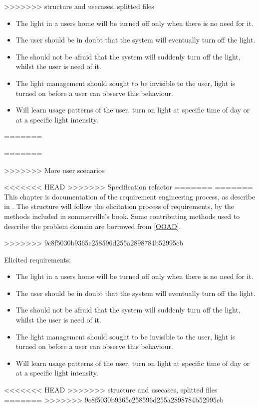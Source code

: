 
>>>>>>> structure and usecases, splitted files

\begin{itemize}
\item The light in a users home will be turned off only when there is no need for it.
\item The user should be in doubt that the system will eventually turn off the light.
\item The should not be afraid that the system will suddenly turn off the light, whilst the user is need of it.
\item The light management should sought to be invisible to the user, light is turned on before a user can observe this behaviour.
\item Will learn usage patterns of the user, turn on light at specific time of day or at a specific light intensity.
\end{itemize}
=======

=======

>>>>>>> More user scenarios



<<<<<<< HEAD
>>>>>>> Specification refactor
=======
=======
This chapter is documentation of the requirement engineering process, as describe in \cite{sommerville}. The structure will follow the elicitation process of requirements, by the methods included in sommerville's book. Some contributing methods used to describe the problem domain are borrowed from \cref{OOAD}. 









>>>>>>> 9c8f5030b9365c258596d255a2898784b52995cb



Elicited requirements: %

\begin{itemize}
\item The light in a users home will be turned off only when there is no need for it.
\item The user should be in doubt that the system will eventually turn off the light.
\item The should not be afraid that the system will suddenly turn off the light, whilst the user is need of it.
\item The light management should sought to be invisible to the user, light is turned on before a user can observe this behaviour.
\item Will learn usage patterns of the user, turn on light at specific time of day or at a specific light intensity.
\end{itemize}
<<<<<<< HEAD
>>>>>>> structure and usecases, splitted files
=======
>>>>>>> 9c8f5030b9365c258596d255a2898784b52995cb

